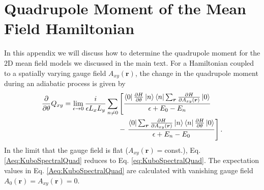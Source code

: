 \documentclass[prb,aps,twocolumn,groupaddress,floatfix]{revtex4-1}
\begin{document}
\section{Quadrupole Moment of the Mean Field Hamiltonian}\label{app:QuadMF}
In this appendix we will discuss how to determine the quadrupole moment for the $2$D mean field models we discussed in the main text. For a Hamiltonian coupled to a spatially varying gauge field $A_{xy}(\bm{r})$, the change in the quadrupole moment during an adiabatic process is given by
\begin{equation}
\begin{split}
\frac{\partial}{\partial \theta} Q_{xy} = \lim_{\epsilon \rightarrow 0}\frac{i}{\epsilon L_x L_y}\sum_{n\neq 0}&\left[\frac{\bra{0} \frac{\partial H}{\partial\theta}\ket{n}\bra{n} \sum_{\bm{r}}\frac{\partial H}{\partial{A_{xy}(\bm{r})}} \ket{0}}{\epsilon + E_0 - E_n}\right. \\ & -  \left.\frac{\bra{0}  \sum_{\bm{r}}\frac{\partial H}{\partial{A_{xy}(\bm{r})}}\ket{n}\bra{n} \frac{\partial H}{\partial\theta} \ket{0}}{\epsilon + E_n - E_0}\right]. \label{Aeq:KuboSpectralQuad}
\end{split}
\end{equation}
In the limit that the gauge field is flat ($A_{xy}(\bm{r}) =$const.), Eq. \ref{Aeq:KuboSpectralQuad} reduces to Eq. \ref{eq:KuboSpectralQuad}. The expectation values in Eq. \ref{Aeq:KuboSpectralQuad} are calculated with vanishing gauge field $A_0(\bm{r}) = A_{xy}(\bm{r}) = 0$. 
\end{document}
